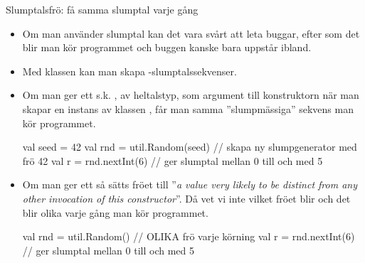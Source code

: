 \begin{Slide}{Slumptalsfrö: få samma slumptal varje gång}\SlideFontTiny
\begin{itemize}
\item Om man använder slumptal kan det vara svårt att leta buggar, efter som det blir  man kör programmet och buggen kanske bara uppstår ibland.

\item Med klassen  kan man skapa -slumptalssekvenser.
\pause
\item Om man ger ett s.k.  , av heltalstyp, som argument till konstruktorn när man skapar en instans av klassen , får man samma ''slumpmässiga'' sekvens  man kör programmet.

\begin{Code}
  val seed = 42
  val rnd = util.Random(seed) // skapa ny slumpgenerator med frö 42
  val r = rnd.nextInt(6) // ger slumptal mellan 0 till och med 5
\end{Code}
\pause
\item Om man  ger ett  så sätts fröet till ''\emph{a value very likely to be distinct from any other invocation of this constructor}''. Då vet vi inte vilket fröet blir och det blir olika varje gång man kör programmet.
\begin{Code}
  val rnd = util.Random() // OLIKA frö varje körning
  val r = rnd.nextInt(6) // ger slumptal mellan 0 till och med 5
\end{Code}
\pause
\end{itemize}
\end{Slide}

%
%
%
%

